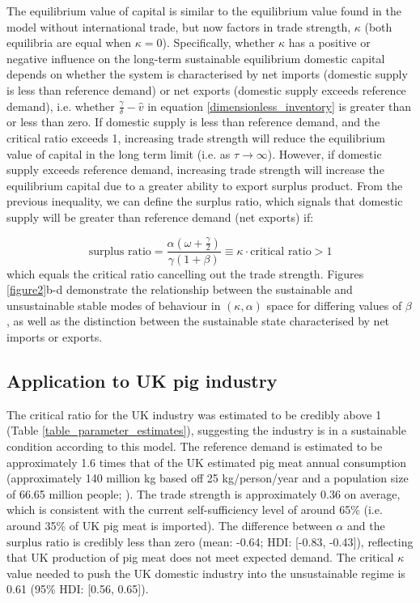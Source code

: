 \documentclass[12pt]{article}
\begin{document}
The equilibrium value of capital is similar to the equilibrium value found in the model without international trade, but now factors in trade strength, $\kappa$ (both equilibria are equal when $\kappa = 0$). Specifically, whether $\kappa$ has a positive or negative influence on the long-term sustainable equilibrium domestic capital depends on whether the system is characterised by net imports (domestic supply is less than reference demand) or net exports (domestic supply exceeds reference demand), i.e. whether $\frac{\gamma}{\delta} - \hat{v}$ in equation \ref{dimensionless_inventory} is greater than or less than zero. If domestic supply is less than reference demand, and the critical ratio exceeds 1, increasing trade strength will reduce the equilibrium value of capital in the long term limit (i.e. as $\tau \rightarrow \infty$). However, if domestic supply exceeds reference demand, increasing trade strength will increase the equilibrium capital due to a greater ability to export surplus product. From the previous inequality, we can define the surplus ratio, which signals that domestic supply will be greater than reference demand (net exports) if:

\begin{equation}
  \text{surplus ratio} = \frac{\alpha (\omega + \frac{\gamma}{2})}{\gamma (1 + \beta)} \equiv \kappa \cdot \text{critical ratio} > 1
\end{equation}
%
which equals the critical ratio cancelling out the trade strength. Figures \ref{figure2}b-d demonstrate the relationship between the sustainable and unsustainable stable modes of behaviour in $(\kappa, \alpha)$ space for differing values of $\beta$, as well as the distinction between the sustainable state characterised by net imports or exports.

\subsection{Application to UK pig industry}
The critical ratio for the UK industry was estimated to be credibly above 1 (Table \ref{table_parameter_estimates}), suggesting the industry is in a sustainable condition according to this model. The reference demand is estimated to be approximately 1.6 times that of the UK estimated pig meat annual consumption (approximately 140 million kg based off 25 kg/person/year and a population size of 66.65 million people; \cite{AHDBpocketbook2018}). The trade strength is approximately 0.36 on average, which is consistent with the current self-sufficiency level of around 65\% (i.e. around 35\% of UK pig meat is imported). The difference between $\alpha$ and the $\text{surplus ratio}$ is credibly less than zero (mean: -0.64; HDI: [-0.83, -0.43]), reflecting that UK production of pig meat does not meet expected demand. The critical $\kappa$ value needed to push the UK domestic industry into the unsustainable regime is 0.61 (95\% HDI: [0.56, 0.65]).
\end{document}
